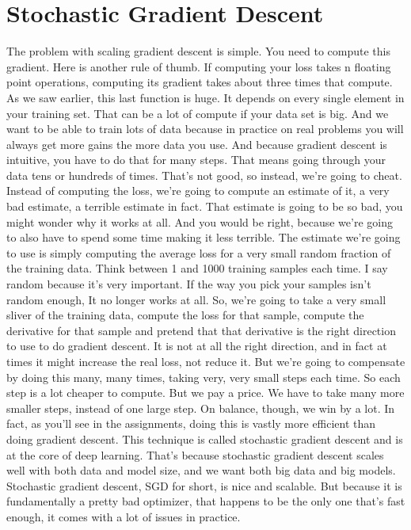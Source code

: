 \documentclass{article}
\begin{document}
\section{Stochastic Gradient Descent}
The problem with scaling
gradient descent is simple.
You need to compute this gradient.
Here is another rule of thumb.
If computing your loss takes
n floating point operations,
computing its gradient takes
about three times that compute.
As we saw earlier,
this last function is huge.
It depends on every single
element in your training set.
That can be a lot of compute
if your data set is big.
And we want to be able to train
lots of data because in practice
on real problems you will always get
more gains the more data you use.
And because gradient
descent is intuitive,
you have to do that for many steps.
That means going through your
data tens or hundreds of times.
That's not good, so instead,
we're going to cheat.
Instead of computing the loss, we're
going to compute an estimate of it,
a very bad estimate,
a terrible estimate in fact.
That estimate is going to be so bad,
you might wonder why it works at all.
And you would be right,
because we're going to also have to
spend some time making it less terrible.
The estimate we're going to use is
simply computing the average loss for
a very small random fraction
of the training data.
Think between 1 and
1000 training samples each time.
I say random because
it's very important.
If the way you pick your
samples isn't random enough,
It no longer works at all.
So, we're going to take a very small
sliver of the training data, compute
the loss for that sample, compute the
derivative for that sample and pretend
that that derivative is the right
direction to use to do gradient descent.
It is not at all the right direction,
and
in fact at times it might increase
the real loss, not reduce it.
But we're going to compensate
by doing this many, many times,
taking very, very small steps each time.
So each step is a lot
cheaper to compute.
But we pay a price.
We have to take many more smaller steps,
instead of one large step.
On balance, though, we win by a lot.
In fact,
as you'll see in the assignments,
doing this is vastly more efficient
than doing gradient descent.
This technique is called
stochastic gradient descent and
is at the core of deep learning.
That's because stochastic gradient
descent scales well with both data and
model size, and
we want both big data and big models.
Stochastic gradient descent, SGD for
short, is nice and scalable.
But because it is fundamentally a pretty
bad optimizer, that happens to be
the only one that's fast enough, it
comes with a lot of issues in practice.
\end{document}
